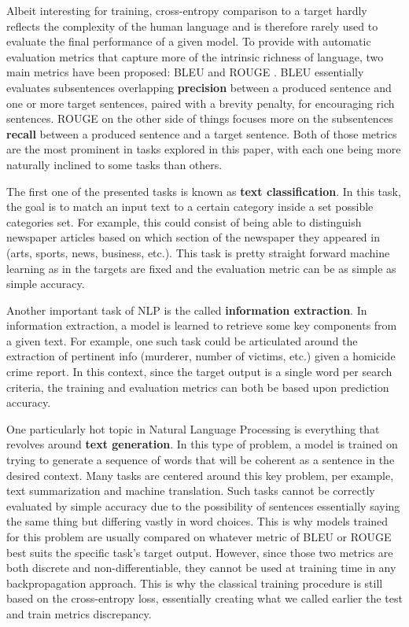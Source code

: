 \documentclass[twocolumn]{article}
\begin{document}
Albeit interesting for training, cross-entropy comparison to a target hardly reflects the complexity of the human language and is therefore rarely used to evaluate the final performance of a given model. To provide with automatic evaluation metrics that capture more of the intrinsic richness of language, two main metrics have been proposed: BLEU \citep{BLEU} and ROUGE \citep{ROUGE}. BLEU essentially evaluates subsentences overlapping \textbf{precision} between a produced sentence and one or more target sentences, paired with a brevity penalty, for encouraging rich sentences. ROUGE on the other side of things focuses more on the subsentences \textbf{recall} between a produced sentence and a target sentence. Both of those metrics are the most prominent in tasks explored in this paper, with each one being more naturally inclined to some tasks than others.

The first one of the presented tasks is known as \textbf{text classification}. In this task, the goal is to match an input text to a certain category inside a set possible categories set. For example, this could consist of being able to distinguish newspaper articles based on which section of the newspaper they appeared in (arts, sports, news, business, etc.). This task is pretty straight forward machine learning as in the targets are fixed and the evaluation metric can be as simple as simple accuracy.

Another important task of NLP is the called \textbf{information extraction}. In information extraction, a model is learned to retrieve some key components from a given text. For example, one such task could be articulated around the extraction of pertinent info (murderer, number of victims, etc.) given a homicide crime report. In this context, since the target output is a single word per search criteria, the training and evaluation metrics can both be based upon prediction accuracy.

One particularly hot topic in Natural Language Processing is everything that revolves around \textbf{text generation}. In this type of problem, a model is trained on trying to generate a sequence of words that will be coherent as a sentence in the desired context. Many tasks are centered around this key problem, per example, text summarization and machine translation. Such tasks cannot be correctly evaluated by simple accuracy due to the possibility of sentences essentially saying the same thing but differing vastly in word choices. This is why models trained for this problem are usually compared on whatever metric of BLEU or ROUGE best suits the specific task's target output. However, since those two metrics are both discrete and non-differentiable, they cannot be used at training time in any backpropagation approach. This is why the classical training procedure is still based on the cross-entropy loss, essentially creating what we called earlier the test and train metrics discrepancy.
\end{document}
